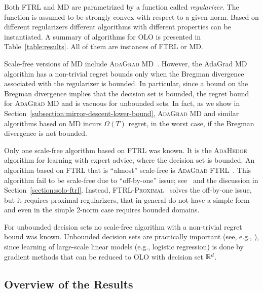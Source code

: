 Both \textsc{FTRL} and \textsc{MD} are parametrized by a function called
\emph{regularizer}. The function is assumed to be strongly convex with respect
to a given norm. Based on different regularizers different algorithms with
different properties can be instantiated. A summary of algorithms for OLO is
presented in Table~\ref{table:results}.  All of them are instances of
\textsc{FTRL} or \textsc{MD}.

Scale-free versions of \textsc{MD} include \textsc{AdaGrad
MD}~\cite{Duchi-Hazan-Singer-2011}. However, the AdaGrad MD algorithm has a
non-trivial regret bounds only when the Bregman divergence associated with the
regularizer is bounded. In particular, since a bound on the Bregman divergence
implies that the decision set is bounded, the regret bound for \textsc{AdaGrad
MD} and is vacuous for unbounded sets. In fact, as we show in
Section~\ref{subsection:mirror-descent-lower-bound}, \textsc{AdaGrad MD} and
similar algorithms based on \textsc{MD} incurs $\Omega(T)$ regret, in the worst
case, if the Bregman divergence is not bounded.

Only one scale-free algorithm based on \textsc{FTRL} was known. It is the
\textsc{AdaHedge}~\cite{de-Rooij-van-Erven-Grunwald-Koolen-2014} algorithm for
learning with expert advice, where the decision set is bounded. An algorithm
based on \textsc{FTRL} that is ``almost'' scale-free is \textsc{AdaGrad
FTRL}~\cite{Duchi-Hazan-Singer-2011}.  This algorithm fail to be scale-free due
to ``off-by-one'' issue; see~\cite{McMahan-2014} and the discussion in
Section~\ref{section:solo-ftrl}. Instead,
\textsc{FTRL-Proximal}~\cite{McMahan-Streeter-2010,McMahan-2014} solves the
off-by-one issue, but it requires proximal regularizers, that in general do not
have a simple form and even in the simple 2-norm case requires bounded domains.

For unbounded decision sets no scale-free algorithm with a non-trivial regret
bound was known. Unbounded decision sets are practically important (see, e.g.,
\cite{Mcmahan-Holt-Sculley-2013}), since learning of large-scale linear models
(e.g., logistic regression) is done by gradient methods that can be reduced to
OLO with decision set $\mathbb{R}^d$.

\subsection{Overview of the Results}

